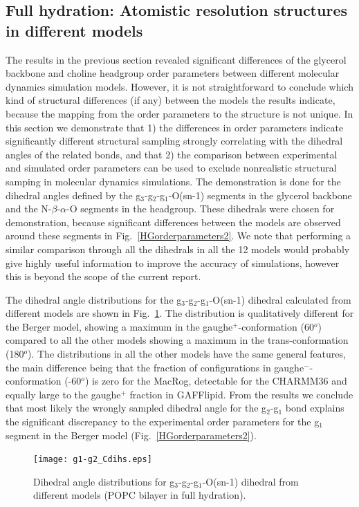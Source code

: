 \documentclass[pre,aps,floatfix,authordate1-4,twocolumn]{revtex4-1}
\begin{document}
\subsection{Full hydration: Atomistic resolution structures in different models}

The results in the previous section revealed significant differences of the glycerol backbone and choline headgroup
order parameters between different molecular dynamics simulation models.
However, it is not straightforward to conclude which kind of structural differences (if any)
between the models the results indicate, because the mapping from the order parameters to the 
structure is not unique. In this section we demonstrate that 1) the differences in order parameters
indicate significantly different structural sampling strongly correlating with the dihedral angles of the related bonds,
and that 2) the comparison between experimental and simulated order parameters can be used to exclude
nonrealistic structural samping in molecular dynamics simulations. The demonstration is done for 
the dihedral angles defined by the g$_3$-g$_2$-g$_1$-O(sn-1) segments in the glycerol backbone and 
the N-$\beta$-$\alpha$-O segments in the headgroup. These dihedrals were chosen for demonstration, because 
significant differences between the models are observed around these segments in Fig.~\ref{HGorderparameters2}.
We note that performing a similar comparison through all the dihedrals in all the 12  models would probably give highly useful
information to improve the accuracy of simulations, however this is beyond the scope of the current report. 

The dihedral angle distributions for the  g$_3$-g$_2$-g$_1$-O(sn-1) dihedral calculated from different models are
shown in Fig.~\ref{dihDISTS}. The distribution is qualitatively different for the Berger model, showing a maximum in 
the gaughe$^+$-conformation (60$^o$) compared to all the other models showing a maximum in the trans-conformation (180$^o$).
The distributions in all the other models have the same general features, the main difference being that the
fraction of configurations in gaughe$^-$-conformation (-60$^o$) is zero for the MacRog, detectable for the CHARMM36 and
equally large to the gaughe$^+$ fraction in GAFFlipid. From the results we conclude that most likely the wrongly sampled
dihedral angle for the g$_2$-g$_1$ bond explains the significant discrepancy to the experimental order parameters
for the g$_1$ segment in the Berger model (Fig.~\ref{HGorderparameters2}).
\begin{figure}[]
  \centering
  \texttt{[image: g1-g2\_Cdihs.eps]}
  \caption{\label{dihDISTS}
    Dihedral angle distributions for g$_3$-g$_2$-g$_1$-O(sn-1) dihedral from different models (POPC bilayer in full hydration).
  } 
\end{figure}
\end{document}
